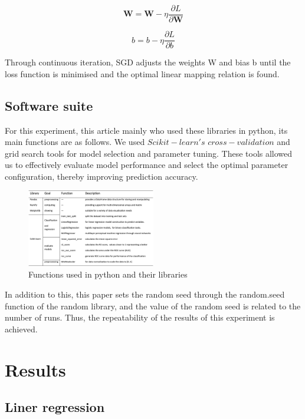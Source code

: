 \documentclass[conference]{IEEEtran}
\begin{document}
\begin{equation}
    \mathbf{W} = \mathbf{W} - \eta \frac{\partial L}{\partial \mathbf{W}}
\end{equation}

\begin{equation}
    b = b - \eta \frac{\partial L}{\partial b}
\end{equation}

Through continuous iteration, SGD adjusts the weights W and bias b until the loss function is minimised and the optimal linear mapping relation is found.

\subsection{Software suite}

For this experiment, this article mainly who used these libraries in python, its main functions are as follows. We used $Scikit-learn's$\cite{pedregosa2011scikit} $cross-validation$ and grid search tools for model selection and parameter tuning. These tools allowed us to effectively evaluate model performance and select the optimal parameter configuration, thereby improving prediction accuracy.

\begin{figure}[H]
    \centering
    \includegraphics[width=0.5\textwidth]{library.png} %
    \caption{Functions used in python and their libraries}
    \label{fig:example2_image}
\end{figure}

In addition to this, this paper sets the random seed through the random.seed function of the random library, and the value of the random seed is related to the number of runs. Thus, the repeatability of the results of this experiment is achieved.


\section{Results}
\subsection{Liner regression}
\end{document}
